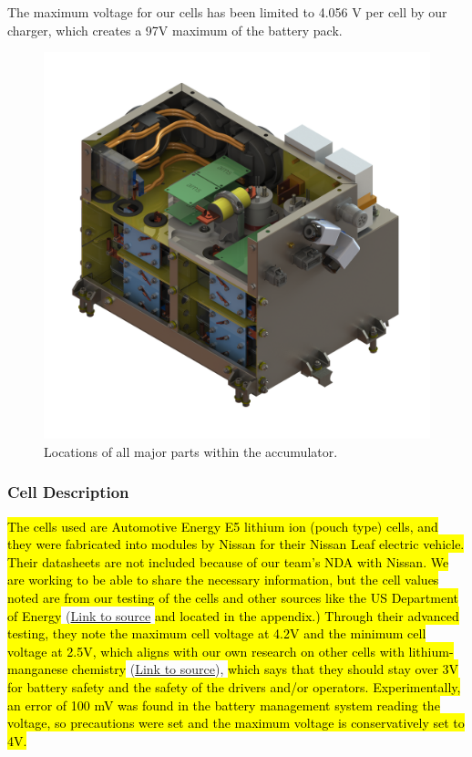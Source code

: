 \documentclass{article}
\DeclareRobustCommand{\hlr}[1]{{\sethlcolor{red}\hl{#1}}}
\begin{document}
            The maximum voltage for our cells has been limited to 4.056 V per cell by our charger, which creates a 97V maximum of the battery pack.

            \begin{figure}[H]
                \centering
                \includegraphics[width = 0.7 \textwidth]{accumulator_internal_isoview}
                \caption{Locations of all major parts within the accumulator. }
                \label{accumlocations}
            \end{figure}

        \subsubsection{Cell Description} \label{celldescription}

        \hlr{The cells used are Automotive Energy E5 lithium ion (pouch type) cells, and they were fabricated into modules by Nissan for their Nissan Leaf electric vehicle. Their datasheets are not included because of our team's NDA with Nissan. We are working to be able to share the necessary information, but the cell values noted are from our testing of the cells and other sources like the US Department of Energy} (\href{http://energy.gov/sites/prod/files/2014/02/f8/battery_leaf_0356.pdf}{Link to source} \hlr{and located in the appendix.) Through their advanced testing, they note the maximum cell voltage at 4.2V and the minimum cell voltage at 2.5V, which aligns with our own research on other cells with lithium-manganese chemistry} (\href{http://batteryuniversity.com/learn/article/discharge_methods}{Link to source}), \hlr{which says that they should stay over 3V for battery safety and the safety of the drivers and/or operators. Experimentally, an error of 100 mV was found in the battery management system reading the voltage, so precautions were set and the maximum voltage is conservatively set to 4V.}
\end{document}
